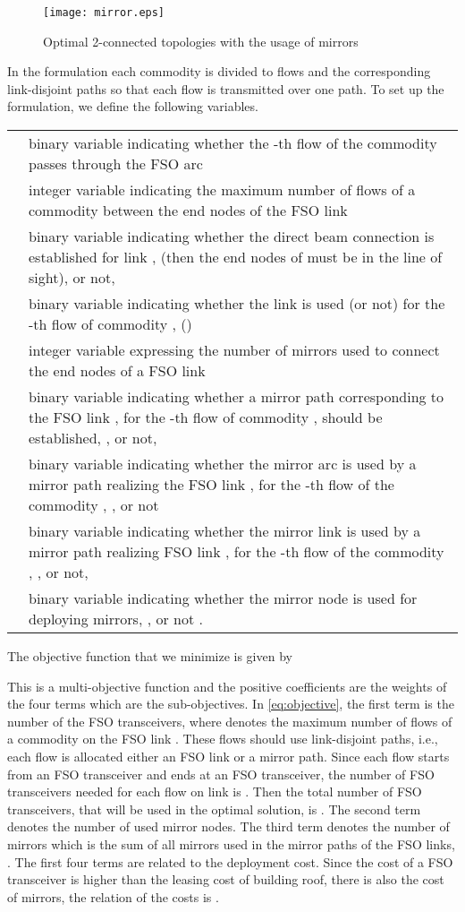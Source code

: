 \documentclass[onecolumn,11pt,draftclsnofoot]{IEEEtran}
\begin{document}
\begin{figure}[!hbtp]
  \centering
  \texttt{[image: mirror.eps]}\\
  \caption{Optimal 2-connected topologies with the usage of mirrors}\label{fig:mirror}
\end{figure}

In the formulation each commodity is divided to  flows and the corresponding  link-disjoint paths so that each flow is transmitted over one path. To set up the formulation, we define the following variables.

\begin{tabular}{lp{16cm}}
 & binary variable indicating whether the -th flow  of the commodity  passes through the FSO arc \\
 & integer variable indicating the maximum number of flows of a commodity between the end nodes of the FSO link \\
 & binary variable indicating whether the direct beam connection is established for link ,  (then the end nodes of  must be in the line of sight), or not, \\
 & binary variable indicating whether the link  is used (or not) for the -th flow of commodity ,  ()\\
 &  integer variable expressing the number of mirrors used to connect the end nodes of a FSO link \\
 &  binary variable indicating whether a mirror path corresponding to the FSO link , for the -th flow of commodity , should be established, , or not,  \\
 & binary variable indicating whether the mirror arc   is used by a mirror path realizing the FSO link , for the -th flow of the commodity , , or not \\
 & binary variable indicating whether the mirror link  is used by a mirror path realizing FSO link , for the -th flow of the commodity , ,  or not,  \\
 &  binary variable indicating whether the mirror node  is used for deploying mirrors, , or not .
\end{tabular}

The objective function that we minimize is given by


This is a multi-objective function and the positive coefficients  are the weights of the four terms which are the sub-objectives. In \eqref{eq:objective}, the first term is the number of the FSO transceivers, where  denotes the maximum number of flows of a commodity on the FSO link . These flows should use link-disjoint paths, i.e., each flow is allocated either an FSO link  or a mirror path. Since each flow starts from an FSO transceiver and ends at an FSO transceiver, the number of FSO transceivers needed for each flow on link  is . Then the total number of  FSO transceivers,  that will be used in the optimal solution,  is .
The  second term denotes the number of used mirror nodes.
The  third term denotes the number of mirrors which is the sum of all mirrors used in the mirror paths of the FSO links, .
The first four terms are related to the deployment cost. Since the cost of a FSO transceiver is higher than the leasing cost of building roof,  there is also the cost of mirrors, the relation of the costs is .
\end{document}

